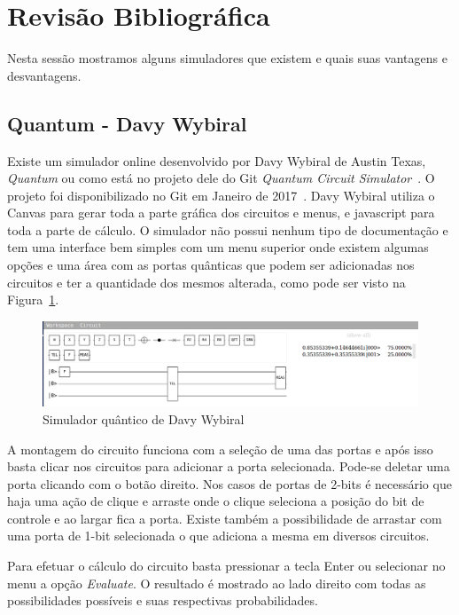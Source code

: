 \documentclass[a4paper, 12pt, oneside]{book}
\begin{document}
\section{Revisão Bibliográfica}

Nesta sessão mostramos alguns simuladores que existem e quais suas vantagens e desvantagens.

\subsection{Quantum - Davy Wybiral}

Existe um simulador online desenvolvido por Davy Wybiral de Austin Texas, \textit{Quantum} ou como está no projeto dele do Git \textit{Quantum Circuit Simulator}~\cite{davyw}. O projeto foi disponibilizado no Git em Janeiro de 2017~\cite{gitdavyw}. Davy Wybiral utiliza o Canvas para gerar toda a parte gráfica dos circuitos e menus, e javascript para toda a parte de cálculo. O simulador não possui nenhum tipo de documentação e tem uma interface bem simples com um menu superior onde existem algumas opções e uma área com as portas quânticas que podem ser adicionadas nos circuitos e ter a quantidade dos mesmos alterada, como pode ser visto na Figura~\ref{fig:davyw}.

\begin{figure}[hbtp]
\centering
\includegraphics[scale=0.36]{davyw.jpg}
\caption{Simulador quântico de Davy Wybiral}
\label{fig:davyw}
\end{figure}

A montagem do circuito funciona com a seleção de uma das portas e após isso basta clicar nos circuitos para adicionar a porta selecionada. Pode-se deletar uma porta clicando com o botão direito. Nos casos de portas de 2-bits é necessário que haja uma ação de clique e arraste onde o clique seleciona a posição do bit de controle e ao largar fica a porta. Existe também a possibilidade de arrastar com uma porta de 1-bit selecionada o que adiciona a mesma em diversos circuitos.

Para efetuar o cálculo do circuito basta pressionar a tecla Enter ou selecionar no menu a opção \textit{Evaluate}. O resultado é mostrado ao lado direito com todas as possibilidades possíveis e suas respectivas probabilidades.
\end{document}
